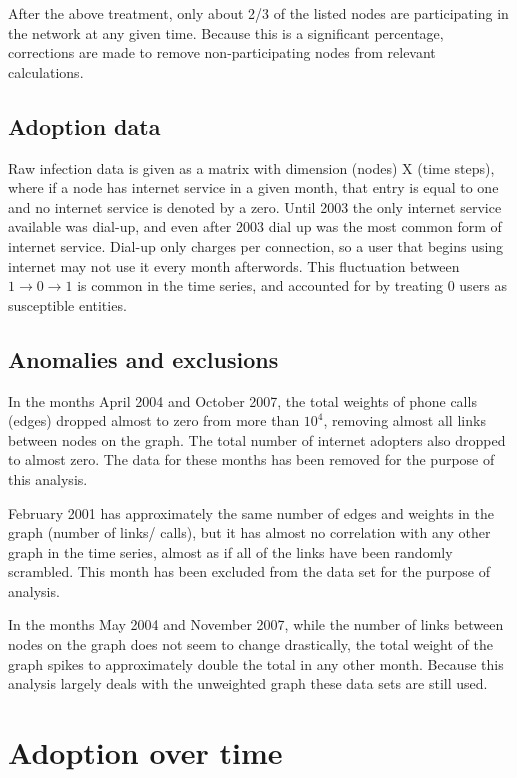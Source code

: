 \documentclass[12pt]{article}
\begin{document}
After the above treatment, only about 2/3 of the listed nodes are participating in the network at any given time. Because this is a significant percentage, corrections are made to remove non-participating nodes from relevant calculations.

\subsection{Adoption data}
Raw infection data is given as a matrix with dimension (nodes) X (time steps), where if a node has internet service in a given month, that entry is equal to one and no internet service is denoted by a zero. Until 2003 the only internet service available was dial-up, and even after 2003 dial up was the most common form of internet service. Dial-up only charges per connection, so a user that begins using internet may not use it every month afterwords. This fluctuation between \(1 \rightarrow 0 \rightarrow 1\) is common in the time series, and accounted for by treating \(0\) users as susceptible entities.

\subsection{Anomalies and exclusions}
In the months April 2004 and October 2007, the total weights of phone calls (edges) dropped almost to zero from more than \(10^4\), removing almost all links between nodes on the graph. The total number of internet adopters also dropped to almost zero. The data for these months has been removed for the purpose of this analysis.

February 2001 has approximately the same number of edges and weights in the graph (number of links/ calls), but it has almost no correlation with any other graph in the time series, almost as if all of the links have been randomly scrambled. This month has been excluded from the data set for the purpose of analysis.

In the months May 2004 and November 2007, while the number of links between nodes on the graph does not seem to change drastically, the total weight of the graph spikes to approximately double the total in any other month. Because this analysis largely deals with the unweighted graph these data sets are still used.

\section{Adoption over time}
\end{document}
